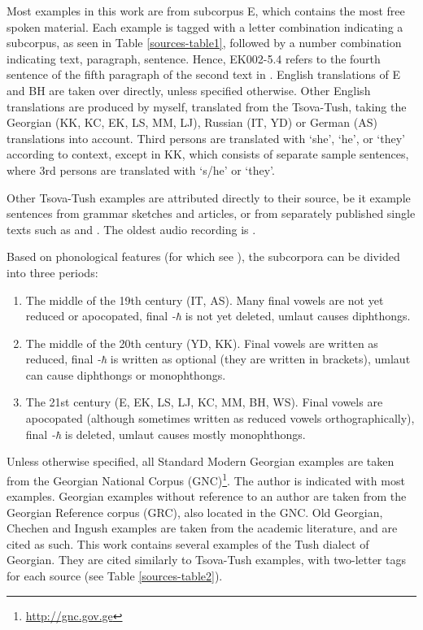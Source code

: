 Most examples in this work are from subcorpus E, which contains the most free spoken material. Each example is tagged with a letter combination indicating a subcorpus, as seen in Table \ref{sources-table1}, followed by a number combination indicating text, paragraph, sentence. Hence, EK002-5.4 refers to the fourth sentence of the fifth paragraph of the second text in \textcite{kadagidze09}. English translations of E and BH  are taken over directly, unless specified otherwise. Other English translations are produced by myself, translated from the Tsova-Tush, taking the Georgian (KK, KC, EK, LS, MM, LJ), Russian (IT, YD) or German (AS) translations into account. Third persons are translated with `she', `he', or `they' according to context, except in KK, which consists of separate sample sentences, where 3rd persons are translated with `s/he' or `they'.

Other Tsova-Tush examples are attributed directly to their source, be it example sentences from grammar sketches and articles, or from separately published single texts such as \textcite{holiskykadagidze} and \textcite{kojima09}. The oldest audio recording is \textcite{dirr-tt}.

Based on phonological features (for which see ), the subcorpora can be divided into three periods: 

\begin{enumerate}
	\item The middle of the 19th century (IT, AS). Many final vowels are not yet reduced or apocopated, final \textit{-ħ} is not yet deleted, umlaut causes diphthongs.
	\item The middle of the 20th century (YD, KK). Final vowels are written as reduced, final \textit{-ħ} is written as optional (they are written in brackets), umlaut can cause diphthongs or monophthongs.
	\item The 21st century (E, EK, LS, LJ, KC, MM, BH, WS). Final vowels are apocopated (although sometimes written as reduced vowels orthographically), final \textit{-ħ} is deleted, umlaut causes mostly monophthongs.
\end{enumerate}

Unless otherwise specified, all Standard Modern Georgian examples are taken from the Georgian National Corpus (GNC)\footnote{\url{http://gnc.gov.ge}}. The author is indicated with most examples. Georgian examples without reference to an author are taken from the Georgian Reference corpus (GRC), also located in the GNC. Old Georgian, Chechen and Ingush examples are taken from the academic literature, and are cited as such. This work contains several examples of the Tush dialect of Georgian. They are cited similarly to Tsova-Tush examples, with two-letter tags for each source (see Table \ref{sources-table2}). 

